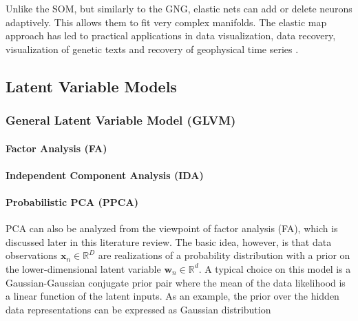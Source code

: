 Unlike the SOM, but similarly to the GNG, elastic nets can add or delete neurons adaptively.  This allows them to fit very complex manifolds.  The elastic map approach has led to practical applications in data visualization, data recovery, visualization of genetic texts and recovery of geophysical time series \citep{Gorban2007ElasticMaps}.


\subsection{Latent Variable Models} \label{sec:LVM}

\subsubsection{General Latent Variable Model (GLVM)} \label{sec:GLVM}

\paragraph{Factor Analysis (FA)} \label{sec:FA}

\paragraph{Independent Component Analysis (IDA)} \label{sec:IDA}

\paragraph{Probabilistic PCA (PPCA)} \label{sec:PPCA}
PCA can also be analyzed from the viewpoint of factor analysis (FA), which is discussed later in this literature review.  The basic idea, however, is that data observations $\bm{x}_{n} \in \mathbb{R}^{D}$ are realizations of a probability distribution with a prior on the lower-dimensional latent variable $\bm{w}_n \in \mathbb{R}^{d}$.  A typical choice on this model is a Gaussian-Gaussian conjugate prior pair where the mean of the data likelihood is a linear function of the latent inputs.  As an example, the prior over the hidden data representations can be expressed as Gaussian distribution

